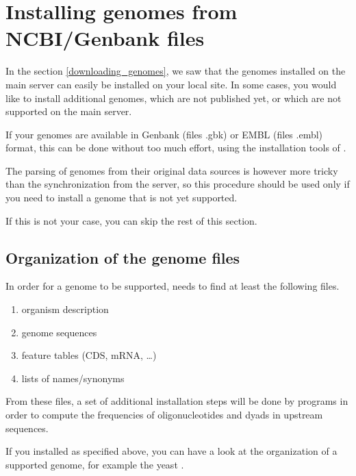 
\chapter{Installing genomes from  NCBI/Genbank files}

In the section \ref{downloading_genomes}, we saw that the genomes
installed on the main \RSAT server can easily be installed on your
local site. In some cases, you would like to install additional
genomes, which are not published yet, or which are not supported on
the main \RSAT server.

If your genomes are available in Genbank (files .gbk) or EMBL (files
.embl) format, this can be done without too much effort, using the
installation tools of \RSAT. 

The parsing of genomes from their original data sources is however
more tricky than the synchronization from the \RSAT server, so this
procedure should be used only if you need to install a genome that is
not yet supported. 

If this is not your case, you can skip the rest of this section.

\section{Organization of the genome files}

In order for a genome to be supported, \RSAT needs to find at least
the following files.

\begin{enumerate}
\item organism description
\item genome sequences
\item feature tables (CDS, mRNA, \ldots)
\item lists of names/synonyms
\end{enumerate}

From these files, a set of additional installation steps will be done
by \RSAT programs in order to compute the frequencies of
oligonucleotides and dyads in upstream sequences.

If you installed \RSAT as specified above, you can have a look at the
organization of a supported genome, for example the yeast
.

